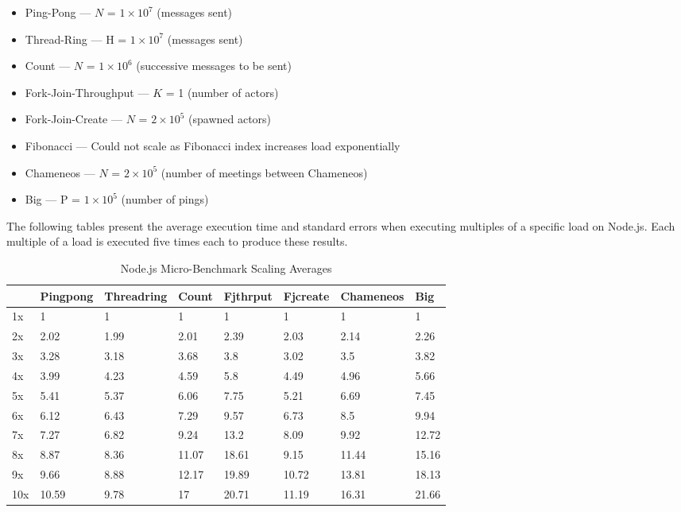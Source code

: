 \documentclass[oneside]{um-fict}
\begin{document}
\begin{itemize}
    \item Ping-Pong --- $N$ = $1\times10^7$ (messages sent)
    \item Thread-Ring --- H = $1\times10^7$ (messages sent)
    \item Count --- $N$ = $1\times10^6$ (successive messages to be sent)
    \item Fork-Join-Throughput --- $K$ = 1 (number of actors)
    \item Fork-Join-Create --- $N$ = $2\times10^5$ (spawned actors)
    \item Fibonacci --- Could not scale as Fibonacci index increases load exponentially 
    \item Chameneos --- $N$ = $2\times10^5$ (number of meetings between Chameneos)
    \item Big --- P = $1\times10^5$ (number of pings) 
\end{itemize}

The following tables present the average execution time and standard errors when executing multiples of a specific load on Node.js. Each multiple of a load is executed five times each to produce these results.
\begin{table}[H]
    \begin{center}
        \begin{tabular}{|l|lllllll|}
        \hline
        & Pingpong & Threadring & Count & Fjthrput & Fjcreate & Chameneos  & Big   \\ \hline
        1x & 1        & 1          & 1     & 1        & 1        & 1     & 1     \\
        2x & 2.02     & 1.99       & 2.01  & 2.39     & 2.03     & 2.14  & 2.26  \\
        3x  & 3.28     & 3.18       & 3.68  & 3.8      & 3.02     & 3.5   & 3.82  \\
        4x & 3.99     & 4.23       & 4.59  & 5.8      & 4.49     & 4.96  & 5.66  \\
        5x  & 5.41     & 5.37       & 6.06  & 7.75     & 5.21     & 6.69  & 7.45  \\
        6x & 6.12     & 6.43       & 7.29  & 9.57     & 6.73     & 8.5   & 9.94  \\
        7x & 7.27     & 6.82       & 9.24  & 13.2     & 8.09     & 9.92  & 12.72 \\
        8x & 8.87     & 8.36       & 11.07 & 18.61    & 9.15     & 11.44 & 15.16 \\
        9x & 9.66     & 8.88       & 12.17 & 19.89    & 10.72    & 13.81 & 18.13 \\
        10x & 10.59    & 9.78       & 17    & 20.71    & 11.19    & 16.31 & 21.66 \\ \hline
        \end{tabular}
        \caption{Node.js Micro-Benchmark Scaling Averages}\label{tab:nodeloadscalingavg}
    \end{center}
\end{table}
\end{document}
